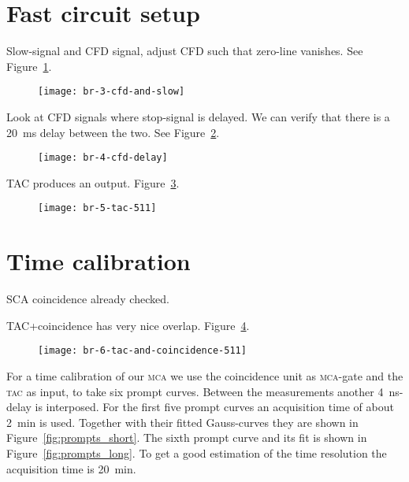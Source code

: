 \documentclass[11pt, english, fleqn, DIV=15, headinclude, BCOR=2cm]{scrreprt}
\begin{document}
\section{Fast circuit setup}

Slow-signal and CFD signal, adjust CFD such that zero-line vanishes. See
Figure~\ref{fig:3-cfd-and-slow}.

\begin{figure}
    \centering
    \texttt{[image: br-3-cfd-and-slow]}
    \caption{%
    }
    \label{fig:3-cfd-and-slow}
\end{figure}

Look at CFD signals where stop-signal is delayed. We can verify that there is a
\SI{20}{\milli\second} delay between the two. See Figure~\ref{fig:4-cfd-delay}.

\begin{figure}
    \centering
    \texttt{[image: br-4-cfd-delay]}
    \caption{%
    }
    \label{fig:4-cfd-delay}
\end{figure}

TAC produces an output. Figure~\ref{fig:5-tac-511}.

\begin{figure}
    \centering
    \texttt{[image: br-5-tac-511]}
    \caption{%
    }
    \label{fig:5-tac-511}
\end{figure}

\section{Time calibration}

SCA coincidence already checked.

TAC+coincidence has very nice overlap.
Figure~\ref{fig:6-tac-and-coincidence-511}.

\begin{figure}
    \centering
    \texttt{[image: br-6-tac-and-coincidence-511]}
    \caption{%
    }
    \label{fig:6-tac-and-coincidence-511}
\end{figure}

For a time calibration of our \textsc{mca} we use the coincidence unit as
\textsc{mca}-gate and the \textsc{tac} as input, to take six prompt curves.
Between the measurements another \SI{4}{\nano\second}-delay is interposed. For
the first five prompt curves an acquisition time of about \SI{2}{\minute} is
used.  Together with their fitted Gauss-curves they are shown in
Figure~\ref{fig:prompts_short}. The sixth prompt curve and its fit is shown in
Figure~\ref{fig:prompts_long}. To get a good estimation of the time resolution
the acquisition time is \SI{20}{\minute}.
\end{document}
